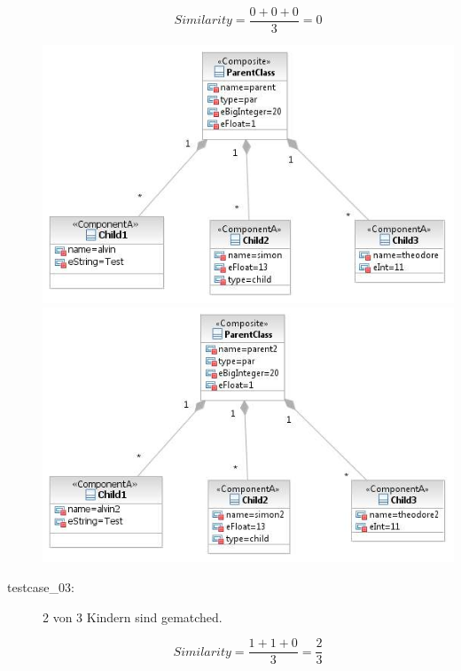 \documentclass[a4paper]{article}
\begin{document}
\begin{description}
   \begin{equation*}
   Similarity = \frac{0+0+0}{3}=0
   \end{equation*}
    
	\includegraphics[scale=0.5]{CompareChildrenMatchedOrSimilarTestScreens/Testcase01model1.jpeg}
	\includegraphics[scale=0.5]{CompareChildrenMatchedOrSimilarTestScreens/Testcase01model2.jpeg}

  \item[testcase\_03:] 2 von 3 Kindern sind gematched.
    
   \begin{equation*}
   Similarity = \frac{1+1+0}{3}=\frac{2}{3}
   \end{equation*}
    

\end{description}
\end{document}
